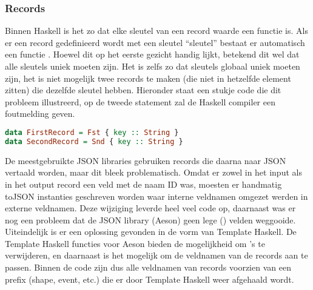 \subsubsection{Records} 
Binnen Haskell is het zo dat elke sleutel van een record waarde een functie is. Als er een record gedefinieerd wordt met een sleutel ``sleutel'' bestaat er automatisch een functie . Hoewel dit op het eerste gezicht handig lijkt, betekend dit wel dat alle sleutels uniek moeten zijn. Het is zelfs zo dat sleutels globaal uniek moeten zijn, het is niet mogelijk twee records te maken (die niet in hetzelfde  element zitten) die dezelfde sleutel hebben. Hieronder staat een stukje code die dit probleem illustreerd, op de tweede statement zal de Haskell compiler een foutmelding geven.

\begin{lstlisting}[language=Haskell]
data FirstRecord = Fst { key :: String }
data SecondRecord = Snd { key :: String }
\end{lstlisting}

De meestgebruikte JSON libraries gebruiken records die daarna naar JSON vertaald worden, maar dit bleek problematisch. Omdat er zowel in het input als in het output record een veld met de naam ID was, moesten er handmatig toJSON instanties geschreven worden waar interne veldnamen omgezet werden in externe veldnamen. Deze wijziging leverde heel veel code op, daarnaast was er nog een probleem dat de JSON library (Aeson) geen lege () velden weggooide.  Uiteindelijk is er een oplossing gevonden in de vorm van Template Haskell. De Template Haskell functies voor Aeson bieden de mogelijkheid om 's te verwijderen, en daarnaast is het mogelijk om de veldnamen van de records aan te passen. Binnen de code zijn dus alle veldnamen van records voorzien van een prefix (shape, event, etc.) die er door Template Haskell weer afgehaald wordt.


